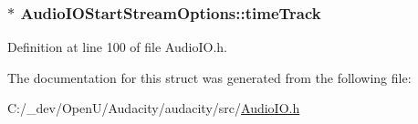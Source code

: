 \subsubsection[{\texorpdfstring{time\+Track}{timeTrack}}]{$\ast$ Audio\+I\+O\+Start\+Stream\+Options\+::time\+Track}\hypertarget{struct_audio_i_o_start_stream_options_a3516f7c72546aa8a73fb25b2e628170f}{}\label{struct_audio_i_o_start_stream_options_a3516f7c72546aa8a73fb25b2e628170f}


Definition at line 100 of file Audio\+I\+O.\+h.



The documentation for this struct was generated from the following file\+:\begin{DoxyCompactItemize}
\item 
C\+:/\+\_\+dev/\+Open\+U/\+Audacity/audacity/src/\hyperlink{_audio_i_o_8h}{Audio\+I\+O.\+h}\end{DoxyCompactItemize}
